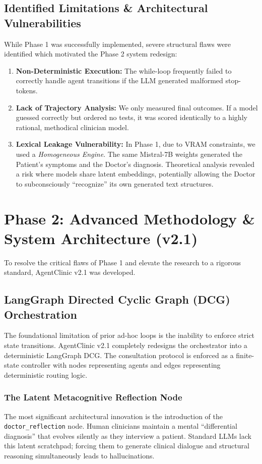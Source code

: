 \documentclass[12pt, a4paper, twoside]{report}
\begin{document}
\section{Identified Limitations \& Architectural Vulnerabilities}
While Phase 1 was successfully implemented, severe structural flaws were identified which motivated the Phase 2 system redesign:
\begin{enumerate}
    \item \textbf{Non-Deterministic Execution:} The while-loop frequently failed to correctly handle agent transitions if the LLM generated malformed stop-tokens.
    \item \textbf{Lack of Trajectory Analysis:} We only measured final outcomes. If a model guessed correctly but ordered no tests, it was scored identically to a highly rational, methodical clinician model.
    \item \textbf{Lexical Leakage Vulnerability:} In Phase 1, due to VRAM constraints, we used a \textit{Homogeneous Engine}. The same Mistral-7B weights generated the Patient's symptoms and the Doctor's diagnosis. Theoretical analysis revealed a risk where models share latent embeddings, potentially allowing the Doctor to subconsciously ``recognize'' its own generated text structures.
\end{enumerate}

\chapter{Phase 2: Advanced Methodology \& System Architecture (v2.1)}

To resolve the critical flaws of Phase 1 and elevate the research to a rigorous standard, AgentClinic v2.1 was developed.

\section{LangGraph Directed Cyclic Graph (DCG) Orchestration}
The foundational limitation of prior ad-hoc loops is the inability to enforce strict state transitions. AgentClinic v2.1 completely redesigns the orchestrator into a deterministic LangGraph DCG. The consultation protocol is enforced as a finite-state controller with nodes representing agents and edges representing deterministic routing logic.

\subsection{The Latent Metacognitive Reflection Node}
The most significant architectural innovation is the introduction of the \texttt{doctor\_reflection} node. Human clinicians maintain a mental ``differential diagnosis'' that evolves silently as they interview a patient. Standard LLMs lack this latent scratchpad; forcing them to generate clinical dialogue and structural reasoning simultaneously leads to hallucinations.
\end{document}
